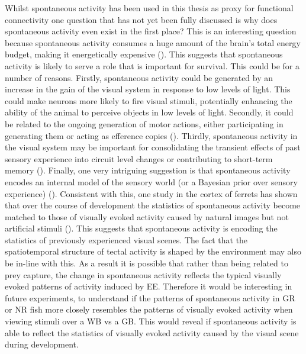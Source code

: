 Whilst spontaneous activity has been used in this thesis as proxy for functional connectivity one question that has not yet been fully discussed is why does spontaneous activity even exist in the first place? This is an interesting question because spontaneous activity consumes a huge amount of the brain's total energy budget, making it energetically expensive (\cite{Tomasi2013EnergeticConnectivity}). This suggests that spontaneous activity is likely to serve a role that is important for survival. This could be for a number of reasons. Firstly,  spontaneous activity could be generated by an increase in the gain of the visual system in response to low levels of light. This could make neurons more likely to fire visual stimuli, potentially enhancing the ability of the animal to perceive objects in low levels of light. Secondly,  it could be related to the ongoing generation of motor actions, either participating in generating them or acting as efference copies (\cite{Stringer2019SpontaneousActivity}). Thirdly, spontaneous activity in the visual system may be important for consolidating the transient effects of past sensory experience into circuit level changes or contributing to short-term memory (\cite{Han2008}). Finally, one very intriguing suggestion is that spontaneous activity encodes an internal model of the sensory world (or a Bayesian prior over sensory experience) (\cite{Rich2015NeuralInference}). Consistent with this, one study in the cortex of ferrets has shown that over the course of development the statistics of spontaneous activity become matched to those of visually evoked activity caused by natural images but not artificial stimuli (\cite{Berkes2011}). This suggests that spontaneous activity is encoding the statistics of previously experienced visual scenes. The fact that the spatiotemporal structure of tectal activity is shaped by the environment may also be in-line with this. As a result it is possible that rather than being related to prey capture, the change in spontaneous activity reflects the typical visually evoked patterns of activity induced by EE. Therefore it would be interesting in future experiments, to understand if the patterns of spontaneous activity in GR or NR fish more closely resembles the patterns of visually evoked activity when viewing stimuli over a WB vs a GB.  This would reveal if spontaneous activity is able to reflect the statistics of visually evoked activity caused by the visual scene during development.


